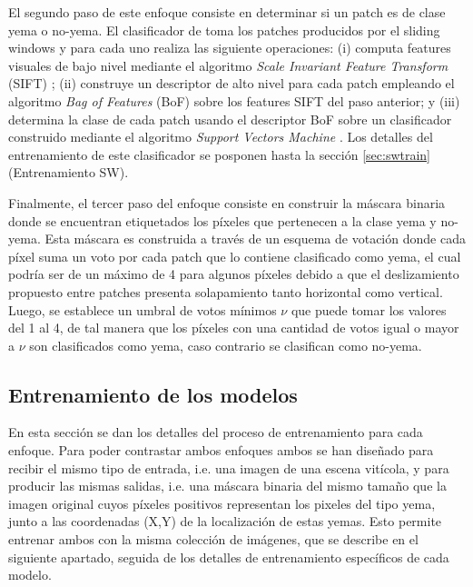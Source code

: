 \documentclass[a4paper,authoryear,review]{elsarticle}
\begin{document}
El segundo paso de este enfoque consiste en determinar si un patch es de clase yema o no-yema. El clasificador de \citet{perez2017image} toma los patches producidos por el sliding windows y para cada uno realiza las siguiente operaciones: (i) computa features visuales de bajo nivel mediante el algoritmo \emph{Scale Invariant Feature Transform} (SIFT) \cite{lowe2004distinctive}; (ii) construye un descriptor de alto nivel para cada patch empleando el algoritmo \emph{Bag of Features} (BoF) \cite{csurka2004visual} sobre los features SIFT del paso anterior; y (iii) determina la clase de cada patch usando el descriptor BoF sobre un clasificador construido mediante el algoritmo \emph{Support Vectors Machine} \cite{vapnik2013nature}. Los detalles del entrenamiento de este clasificador se posponen hasta la sección \ref{sec:swtrain} (Entrenamiento SW).

Finalmente, el tercer paso del enfoque consiste en construir la máscara binaria donde se encuentran etiquetados los píxeles que pertenecen a la clase yema y no-yema. Esta máscara es construida a través de un esquema de votación donde cada píxel suma un voto por cada patch que lo contiene clasificado como yema, el cual podría ser de un máximo de 4 para algunos píxeles debido a que el deslizamiento propuesto entre patches presenta solapamiento tanto horizontal como vertical. Luego, se establece un umbral de votos mínimos $\nu$ que puede tomar los valores del 1 al 4, de tal manera que los píxeles con una cantidad de votos igual o mayor a $\nu$ son clasificados como yema, caso contrario se clasifican como no-yema.



\subsection{Entrenamiento de los modelos} 
\label{sec:train}

En esta sección se dan los detalles del proceso de entrenamiento para cada enfoque. Para poder contrastar ambos enfoques ambos se han diseñado para recibir el mismo tipo de entrada, i.e. una imagen de una escena vitícola, y para producir las mismas salidas, i.e. una máscara binaria del mismo tamaño que la imagen original cuyos píxeles positivos representan los pixeles del tipo yema, junto a las coordenadas (X,Y) de la localización de estas yemas. 
%
Esto permite entrenar ambos con la misma colección de imágenes, que se describe en el siguiente apartado, seguida de los detalles de entrenamiento específicos de cada modelo.
\end{document}

